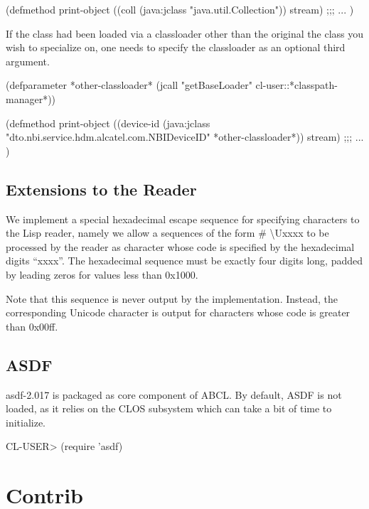 \documentclass[10pt]{book}
\begin{document}
\begin{listing-lisp}
(defmethod print-object ((coll (java:jclass "java.util.Collection"))
                         stream)
  ;;; ...
)
\end{listing-lisp}

If the class had been loaded via a classloader other than the original
the class you wish to specialize on, one needs to specify the
classloader as an optional third argument.

\begin{listing-lisp}

(defparameter *other-classloader*
  (jcall "getBaseLoader" cl-user::*classpath-manager*))
  
(defmethod print-object ((device-id (java:jclass "dto.nbi.service.hdm.alcatel.com.NBIDeviceID" *other-classloader*))
                         stream)
  ;;; ...
)
\end{listing-lisp}

\section{Extensions to the Reader}

We implement a special hexadecimal escape sequence for specifying
characters to the Lisp reader, namely we allow a sequences of the form
\# \textbackslash Uxxxx to be processed by the reader as character whose code is
specified by the hexadecimal digits ``xxxx''.  The hexadecimal sequence
must be exactly four digits long, padded by leading zeros for values
less than 0x1000.

Note that this sequence is never output by the implementation.  Instead,
the corresponding Unicode character is output for characters whose
code is greater than 0x00ff.

\section{ASDF}

asdf-2.017 is packaged as core component of ABCL.  By default, ASDF is
not loaded, as it relies on the CLOS subsystem which can take a bit of
time to initialize.

\begin{listing-lisp}
CL-USER> (require 'asdf)
\end{listing-lisp}

\chapter{Contrib}
\end{document}
